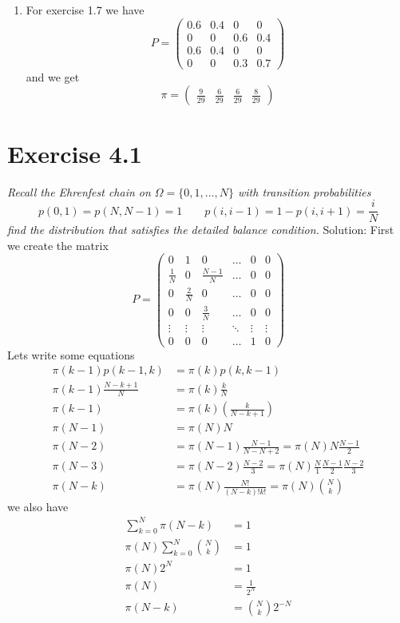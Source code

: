 \documentclass[11pt]{article}
\newcommand{\solution}[1]{{{\textcolor{header}{Solution:} \textcolor{solution}{#1}}}}
\begin{document}
{\begin{enumerate}
        \item For exercise 1.7 we have
            \[
            P = \begin{pmatrix} 
                0.6 & 0.4 & 0 & 0 \\
                0 & 0 & 0.6 & 0.4 \\
                0.6 & 0.4 & 0 & 0\\
                0 & 0 & 0.3 & 0.7
            \end{pmatrix} 
            \] 
            and we get
            \[
                \pi = \begin{pmatrix} \frac{9}{29} & \frac{6}{29} & \frac{6}{29} & \frac{8}{29} \end{pmatrix} 
            \] 
    \end{enumerate}
}

\section{Exercise 4.1}
\emph{
    Recall the Ehrenfest chain on $\Omega = \{0,1,\dots,N\}$ with transition probabilities
     \[
    p(0,1) = p(N,N-1) = 1 \qquad p(i,i-1) = 1 - p(i,i+1) = \frac{i}{N}
    \] 
    find the distribution that satisfies the detailed balance condition.
}
\solution{
    First we create the matrix
    \[
    P = \begin{pmatrix} 
        0 & 1 & 0 & \dots & 0 & 0\\
        \frac{1}{N} & 0 & \frac{N-1}{N} & \dots & 0 & 0\\
        0 & \frac{2}{N} & 0 & \dots & 0 & 0\\
        0 & 0 & \frac{3}{N} & \dots & 0 & 0\\
        \vdots & \vdots& \vdots & \ddots & \vdots & \vdots\\
        0 & 0 & 0 & \dots & 1 & 0
    \end{pmatrix} 
    \] 
    Lets write some equations
    \begin{align*}
        \pi(k-1)p(k-1,k) &= \pi(k)p(k,k-1)\\
        \pi(k-1)\frac{N-k+1}{N} &= \pi(k) \frac{k}{N}\\
        \pi(k-1) &= \pi(k) (\frac{k}{N-k+1})\\
        \pi(N-1) &= \pi(N)N\\
        \pi(N-2) &= \pi(N-1)\frac{N-1}{N-N+2} = \pi(N)N\frac{N-1}{2}\\
        \pi(N-3) &= \pi(N-2)\frac{N-2}{3}=\pi(N)\frac{N}{1}\frac{N-1}{2}\frac{N-2}{3}\\
        \pi(N-k) &= \pi(N) \frac{N!}{(N-k)!k!} = \pi(N) \binom{N}{k}
    \end{align*}
    we also have
    \begin{align*}
        \sum_{k=0}^{N}\pi(N-k) &= 1\\
        \pi(N)\sum_{k=0}^{N}\binom{N}{k} &= 1\\
        \pi(N) 2^{N} &= 1\\
        \pi(N) &= \frac{1}{2^{N}}\\
        \pi(N-k) &= \binom{N}{k} 2^{-N}
    \end{align*}
}
\end{document}
